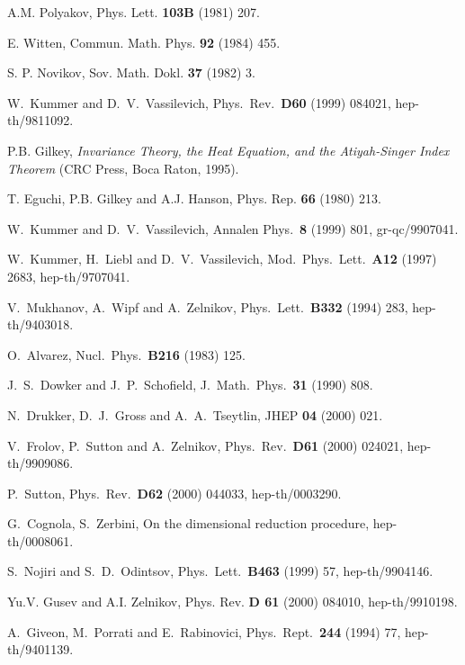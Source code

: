 \documentclass[a4paper,12pt]{article}
\begin{document}
\begin{thebibliography}{99}
A.M. Polyakov, Phys. Lett. {\bf 103B} (1981) 207.

E. Witten, Commun. Math. Phys. {\bf 92} (1984) 455.

S. P. Novikov, Sov. Math. Dokl. {\bf 37} (1982) 3.

W.~Kummer and D.~V.~Vassilevich,
Phys.\ Rev.\  {\bf D60} (1999) 084021, hep-th/9811092.  

P.B. Gilkey, {\it Invariance Theory, the Heat Equation, and
the Atiyah-Singer Index Theorem} (CRC Press, Boca Raton, 1995).

T. Eguchi, P.B. Gilkey and A.J. Hanson,
Phys. Rep. {\bf 66} (1980) 213.

W.~Kummer and D.~V.~Vassilevich,
Annalen Phys.\  {\bf 8} (1999) 801,
gr-qc/9907041.

W.~Kummer, H.~Liebl and D.~V.~Vassilevich,
Mod.\ Phys.\ Lett.\  {\bf A12} (1997) 2683,
hep-th/9707041.

V.~Mukhanov, A.~Wipf and A.~Zelnikov,
Phys.\ Lett.\  {\bf B332} (1994) 283,
hep-th/9403018.

O.~Alvarez,
Nucl.\ Phys.\  {\bf B216} (1983) 125.

J.~S.~Dowker and J.~P.~Schofield,
J.\ Math.\ Phys.\  {\bf 31} (1990) 808.

N.~Drukker, D.~J.~Gross and A.~A.~Tseytlin,
JHEP {\bf 04} (2000) 021.

V.~Frolov, P.~Sutton and A.~Zelnikov,
Phys.\ Rev.\  {\bf D61} (2000) 024021,
hep-th/9909086.

P.~Sutton,
Phys.\ Rev.\  {\bf D62} (2000) 044033, 
hep-th/0003290.

G.~Cognola, S.~Zerbini,
On the dimensional reduction procedure, 
hep-th/0008061.

S.~Nojiri and S.~D.~Odintsov,
Phys.\ Lett.\  {\bf B463} (1999) 57, hep-th/9904146. 

Yu.V. Gusev and A.I. Zelnikov,
Phys. Rev. {\bf D 61} (2000) 084010, hep-th/9910198. 

A.~Giveon, M.~Porrati and E.~Rabinovici,
Phys.\ Rept.\  {\bf 244} (1994) 77, hep-th/9401139.


\end{thebibliography}
\end{document}
